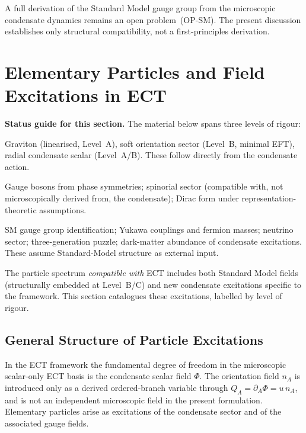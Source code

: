 \documentclass[11pt,a4paper]{article}
\numberwithin{equation}{section}
\begin{document}
A full derivation of the Standard Model gauge group from the
microscopic condensate dynamics remains an open problem~(OP-SM).
The present discussion establishes only structural compatibility,
not a first-principles derivation.

\section{Elementary Particles and Field Excitations in ECT}
\label{sec:particles}

\textbf{Status guide for this section.}
The material below spans three levels of rigour:
\begin{description}[leftmargin=3em,style=unboxed,noitemsep]
  \item[Core ECT (Level~A/B).]
    Graviton (linearised, Level~A), soft orientation sector (Level~B, minimal EFT),
    radial condensate scalar (Level~A/B).
    These follow directly from the condensate action.
  \item[Structural extensions (Level~B).]
    Gauge bosons from phase symmetries; spinorial sector
    (compatible with, not microscopically derived from, the condensate);
    Dirac form under representation-theoretic assumptions.
  \item[Phenomenological embeddings / speculative (Level~C).]
    SM gauge group identification; Yukawa couplings and fermion
    masses; neutrino sector; three-generation puzzle; dark-matter
    abundance of condensate excitations.
    These assume Standard-Model structure as external input.
\end{description}

The particle spectrum \emph{compatible with} ECT includes both
Standard Model fields (structurally embedded at Level~B/C)
and new condensate excitations specific to the framework.
This section catalogues these excitations, labelled by level of rigour.

\subsection{General Structure of Particle Excitations}

In the ECT framework the fundamental degree of freedom in the microscopic scalar-only ECT basis
is the condensate scalar field $\Phi$. The orientation field $n_A$ is introduced
only as a derived ordered-branch variable through $Q_A=\partial_A\Phi=u\,n_A$,
and is not an independent microscopic field in the present formulation. 
Elementary particles arise as excitations of the condensate sector and of the associated gauge fields.
\end{document}
